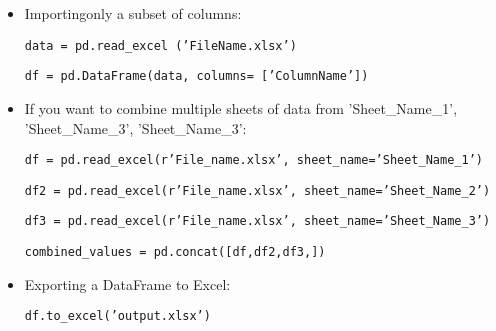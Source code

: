 \documentclass[11pt]{article}
\theoremstyle{definition}
\begin{document}
\begin{itemize}
\item Importingonly a subset of columns: \begin{center}\texttt{data = pd.read\_excel ('FileName.xlsx') }


\texttt{df = pd.DataFrame(data, columns= ['ColumnName'])}
\end{center}



\newpage


\item If you want to combine multiple sheets of data from 'Sheet\_Name\_1', 'Sheet\_Name\_3', 'Sheet\_Name\_3':

\begin{center}
\texttt{df = pd.read\_excel(r'File\_name.xlsx', sheet\_name='Sheet\_Name\_1')}

\texttt{df2 = pd.read\_excel(r'File\_name.xlsx', sheet\_name='Sheet\_Name\_2')}

\texttt{df3 = pd.read\_excel(r'File\_name.xlsx', sheet\_name='Sheet\_Name\_3')}

\texttt{combined\_values = pd.concat([df,df2,df3,])}
\end{center}


\item Exporting a DataFrame to Excel:

\begin{center}

\texttt{df.to\_excel('output.xlsx')}

\end{center}

\end{itemize}
\end{document}
